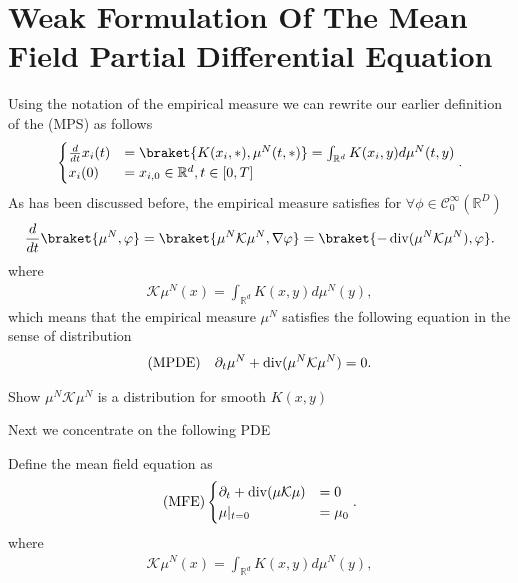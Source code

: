 \section{Weak Formulation Of The Mean Field Partial Differential Equation}
Using the notation of the empirical measure we can rewrite our earlier definition of the (MPS) as follows
\begin{align*}
  \begin{cases}
    \frac{d}{dt} x_i(t) &= \braket{K(x_i,*),\mu^N(t,*)} = \int_{\mathbb{R}^{d} } K(x_{i},y) d\mu ^{N} (t,y)\\
    x_i(0)&=x_{i,0} \in \mathbb{R}^{d} , t \in [0,T]
  \end{cases}
.\end{align*}
As has been discussed before, the empirical measure satisfies for $\forall  \phi  \in \mathcal{C}_0^{\infty}(\mathbb{R}^{D} ) $ 
\begin{align*}
  \frac{d}{dt} \braket{\mu ^{N},\phi  } = \braket{\mu ^{N}\mathcal{K}\mu ^{N},\nabla \phi   } = \braket{- \divergence(\mu^N \mathcal{K} \mu ^{N} ),\phi }
.\end{align*}
where 
\begin{align*}
  \mathcal{K}\mu ^{N}(x) = \int_{\mathbb{R}^{d} }  K(x,y) d\mu ^{N} (y)
,\end{align*}
which means that the empirical measure $\mu ^{N} $ satisfies the following equation in the 
sense of distribution 
\begin{align*}
  \text{(MPDE)} \quad \partial_t \mu ^{N}  + \operatorname{div}(\mu ^{N}\mathcal{K}\mu ^{N}  ) = 0
.\end{align*}
\begin{exercise}
 Show $\mu ^{N}\mathcal{K}\mu ^{N}  $  is a distribution for smooth $K(x,y)$ 
\end{exercise}
Next we concentrate on the following PDE 
\begin{definition}
 Define the mean field equation as 
 \begin{align*}
  \text{(MFE)}\begin{cases}
    \partial_t + \operatorname{div} (\mu \mathcal{K}\mu ) &= 0\\
    \mu \rvert_{t=0} &= \mu_0
  \end{cases}
 .\end{align*}
 where
\begin{align*}
  \mathcal{K}\mu ^{N}(x) = \int_{\mathbb{R}^{d} }  K(x,y) d\mu ^{N} (y)
,\end{align*}
\end{definition}

